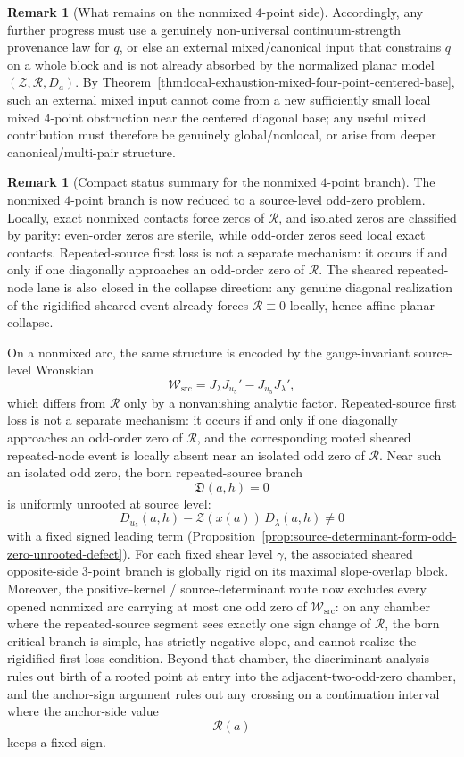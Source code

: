 \documentclass[11pt,a4paper]{amsart}
\theoremstyle{plain}
\theoremstyle{definition}
\newtheorem{remark}[theorem]{Remark}
\begin{document}
\begin{remark}[What remains on the nonmixed $4$-point side]
Accordingly, any further progress must use a genuinely non-universal
continuum-strength provenance law for $q$, or else an external mixed/canonical
input that constrains $q$ on a whole block and is not already absorbed by the
normalized planar model $(\mathcal Z,\mathcal R,D_a)$. By
Theorem~\ref{thm:local-exhaustion-mixed-four-point-centered-base}, such an
external mixed input cannot come from a new sufficiently small local mixed
$4$-point obstruction near the centered diagonal base; any useful mixed
contribution must therefore be genuinely global/nonlocal, or arise from deeper
canonical/multi-pair structure.
\end{remark}

\begin{remark}[Compact status summary for the nonmixed $4$-point branch]
\label{rem:compact-status-summary-nonmixed-four-point}
The nonmixed $4$-point branch is now reduced to a source-level odd-zero
problem.  Locally, exact nonmixed contacts force zeros of $\mathcal R$, and
isolated zeros are classified by parity: even-order zeros are sterile, while
odd-order zeros seed local exact contacts.  Repeated-source first loss is not a
separate mechanism: it occurs if and only if one diagonally approaches an
odd-order zero of $\mathcal R$.  The sheared repeated-node lane is also closed
in the collapse direction: any genuine diagonal realization of the rigidified
sheared event already forces $\mathcal R\equiv 0$ locally, hence
affine-planar collapse.

On a nonmixed arc, the same structure is encoded by the gauge-invariant
source-level Wronskian
\[
\mathcal W_{\mathrm{src}}=J_\lambda J_{u_5}'-J_{u_5}J_\lambda',
\]
which differs from $\mathcal R$ only by a nonvanishing analytic factor.
Repeated-source first loss is not a separate mechanism: it occurs if and only
if one diagonally approaches an odd-order zero of $\mathcal R$, and the
corresponding rooted sheared repeated-node event is locally absent near an
isolated odd zero of $\mathcal R$. Near such an isolated odd zero, the born
repeated-source branch
\[
\mathfrak D(a,h)=0
\]
is uniformly unrooted at source level:
\[
D_{u_5}(a,h)-\mathcal Z(x(a))\,D_\lambda(a,h)\neq 0
\]
with a fixed signed leading term
(Proposition~\ref{prop:source-determinant-form-odd-zero-unrooted-defect}).
For each fixed shear level $\gamma$, the associated sheared opposite-side
$3$-point branch is globally rigid on its maximal slope-overlap block.
Moreover, the positive-kernel / source-determinant route now excludes every
opened nonmixed arc carrying at most one odd zero of
$\mathcal W_{\mathrm{src}}$:
on any chamber where the repeated-source segment sees exactly one sign change of
$\mathcal R$, the born critical branch is simple, has strictly negative slope,
and cannot realize the rigidified first-loss condition. Beyond that chamber, the
discriminant analysis rules out birth of a rooted point at entry into the
adjacent-two-odd-zero chamber, and the anchor-sign argument rules out any
crossing on a continuation interval where the anchor-side value
\[
\mathcal R(a)
\]
keeps a fixed sign.


\end{remark}
\end{document}
